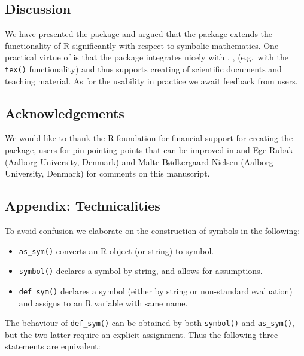 \hypertarget{discussion}{%
\subsection{Discussion}\label{discussion}}

We have presented the  package and argued that the
package extends the functionality of R significantly with respect to
symbolic mathematics. One practical virtue of  is that
the package integrates nicely with ,
\citet{rmarkdown}, (e.g.~with the \texttt{tex()} functionality) and thus
supports creating of scientific documents and teaching material. As for
the usability in practice we await feedback from users.

\hypertarget{acknowledgements}{%
\subsection{Acknowledgements}\label{acknowledgements}}

We would like to thank the R foundation for financial support for
creating the  package, users for pin pointing points
that can be improved in  and Ege Rubak (Aalborg
University, Denmark) and Malte Bødkergaard Nielsen (Aalborg University,
Denmark) for comments on this manuscript.



\hypertarget{appendix-technicalities}{%
\subsection{Appendix: Technicalities}\label{appendix-technicalities}}

To avoid confusion we elaborate on the construction of symbols in the
following:

\begin{itemize}
\tightlist
\item
  \texttt{as\_sym()} converts an R object (or string) to symbol.
\item
  \texttt{symbol()} declares a symbol by string, and allows for
  assumptions.
\item
  \texttt{def\_sym()} declares a symbol (either by string or
  non-standard evaluation) and assigns to an R variable with same name.
\end{itemize}

The behaviour of \texttt{def\_sym()} can be obtained by both
\texttt{symbol()} and \texttt{as\_sym()}, but the two latter require an
explicit assignment. Thus the following three statements are equivalent:


